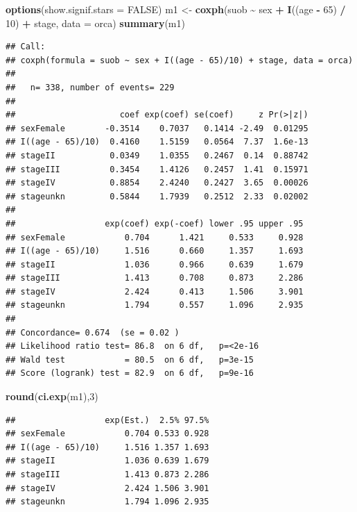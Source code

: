 \documentclass[
]{book}
\newenvironment{Shaded}{\begin{snugshade}}{\end{snugshade}}
\newcommand{\AttributeTok}[1]{\textcolor[rgb]{0.13,0.29,0.53}{#1}}
\newcommand{\ConstantTok}[1]{\textcolor[rgb]{0.56,0.35,0.01}{#1}}
\newcommand{\DecValTok}[1]{\textcolor[rgb]{0.00,0.00,0.81}{#1}}
\newcommand{\FunctionTok}[1]{\textcolor[rgb]{0.13,0.29,0.53}{\textbf{#1}}}
\newcommand{\NormalTok}[1]{#1}
\newcommand{\OtherTok}[1]{\textcolor[rgb]{0.56,0.35,0.01}{#1}}
\newcommand{\SpecialCharTok}[1]{\textcolor[rgb]{0.81,0.36,0.00}{\textbf{#1}}}
\begin{document}
\begin{Shaded}
\begin{Highlighting}[]
\FunctionTok{options}\NormalTok{(}\AttributeTok{show.signif.stars =} \ConstantTok{FALSE}\NormalTok{)}
\NormalTok{m1 }\OtherTok{\textless{}{-}} \FunctionTok{coxph}\NormalTok{(suob }\SpecialCharTok{\textasciitilde{}}\NormalTok{ sex }\SpecialCharTok{+} \FunctionTok{I}\NormalTok{((age }\SpecialCharTok{{-}} \DecValTok{65}\NormalTok{) }\SpecialCharTok{/} \DecValTok{10}\NormalTok{) }\SpecialCharTok{+}\NormalTok{ stage, }\AttributeTok{data =}\NormalTok{ orca)}
\FunctionTok{summary}\NormalTok{(m1)}
\end{Highlighting}
\end{Shaded}

\begin{verbatim}
## Call:
## coxph(formula = suob ~ sex + I((age - 65)/10) + stage, data = orca)
## 
##   n= 338, number of events= 229 
## 
##                     coef exp(coef) se(coef)     z Pr(>|z|)
## sexFemale        -0.3514    0.7037   0.1414 -2.49  0.01295
## I((age - 65)/10)  0.4160    1.5159   0.0564  7.37  1.6e-13
## stageII           0.0349    1.0355   0.2467  0.14  0.88742
## stageIII          0.3454    1.4126   0.2457  1.41  0.15971
## stageIV           0.8854    2.4240   0.2427  3.65  0.00026
## stageunkn         0.5844    1.7939   0.2512  2.33  0.02002
## 
##                  exp(coef) exp(-coef) lower .95 upper .95
## sexFemale            0.704      1.421     0.533     0.928
## I((age - 65)/10)     1.516      0.660     1.357     1.693
## stageII              1.036      0.966     0.639     1.679
## stageIII             1.413      0.708     0.873     2.286
## stageIV              2.424      0.413     1.506     3.901
## stageunkn            1.794      0.557     1.096     2.935
## 
## Concordance= 0.674  (se = 0.02 )
## Likelihood ratio test= 86.8  on 6 df,   p=<2e-16
## Wald test            = 80.5  on 6 df,   p=3e-15
## Score (logrank) test = 82.9  on 6 df,   p=9e-16
\end{verbatim}

\begin{Shaded}
\begin{Highlighting}[]
\FunctionTok{round}\NormalTok{(}\FunctionTok{ci.exp}\NormalTok{(m1),}\DecValTok{3}\NormalTok{)}
\end{Highlighting}
\end{Shaded}

\begin{verbatim}
##                  exp(Est.)  2.5% 97.5%
## sexFemale            0.704 0.533 0.928
## I((age - 65)/10)     1.516 1.357 1.693
## stageII              1.036 0.639 1.679
## stageIII             1.413 0.873 2.286
## stageIV              2.424 1.506 3.901
## stageunkn            1.794 1.096 2.935
\end{verbatim}
\end{document}
